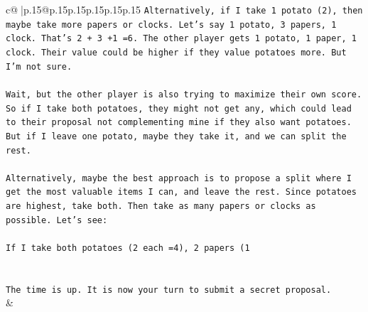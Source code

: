 \documentclass{article}
\begin{document}
{\begin{supertabular}{c@{$\;$}|p{.15\linewidth}@{}p{.15\linewidth}p{.15\linewidth}p{.15\linewidth}p{.15\linewidth}p{.15\linewidth}}
{{{\texttt{Alternatively, if I take 1 potato (2), then maybe take more papers or clocks. Let's say 1 potato, 3 papers, 1 clock. That's 2 + 3 +1 =6. The other player gets 1 potato, 1 paper, 1 clock. Their value could be higher if they value potatoes more. But I'm not sure.} \\
\\ 
\texttt{Wait, but the other player is also trying to maximize their own score. So if I take both potatoes, they might not get any, which could lead to their proposal not complementing mine if they also want potatoes. But if I leave one potato, maybe they take it, and we can split the rest.} \\
\\ 
\texttt{Alternatively, maybe the best approach is to propose a split where I get the most valuable items I can, and leave the rest. Since potatoes are highest, take both. Then take as many papers or clocks as possible. Let's see:} \\
\\ 
\texttt{If I take both potatoes (2 each =4), 2 papers (1} \\
\\ 
\\ 
\texttt{The time is up. It is now your turn to submit a secret proposal.} \\
            }
        }
    }
    & \\ \\


\end{supertabular}}
\end{document}
